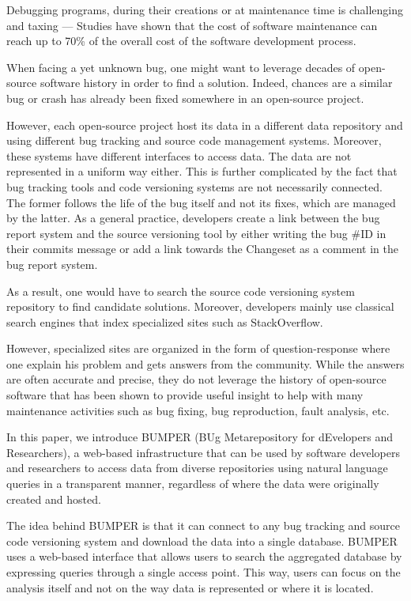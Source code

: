 \documentclass[conference]{IEEEtran}
\begin{document}
Debugging programs, during their creations or at maintenance time is challenging \cite{Pressman2005} and taxing --- Studies have shown that the cost of software maintenance can reach up to 70\% of the overall cost of the software development process.

When facing a yet unknown bug, one might want to leverage decades of open-source software history in order to find a solution. Indeed, chances are a similar bug or crash has already been fixed somewhere in an open-source project.

However, each open-source project host its data in a different data repository and using different bug tracking and source code management systems. Moreover,   these systems have different interfaces to access data.
The data are not represented in a uniform way either.
This is further complicated by the fact that bug tracking tools and code versioning systems are not necessarily connected.
The former follows the life of the bug itself and not its fixes, which are managed by the latter.
As a general practice, developers create a link between the bug report system and the source versioning tool by either writing the bug \#ID in their commits message or add a link towards the Changeset as a comment in the bug report system.

As a result, one would have to search the source code versioning system repository to find candidate solutions.
 Moreover, developers mainly use classical search engines that index specialized sites such as StackOverflow.

However, specialized sites are organized in the form of question-response where one explain his problem and gets answers from the community. While the answers are often accurate and precise, they do not leverage the history of open-source software that has been shown to provide useful insight to help with many maintenance activities such as bug fixing\cite{Saha2014}, bug reproduction\cite{Chen2013a}, fault analysis\cite{Nessa2008}, etc.

In this paper, we introduce BUMPER (BUg Metarepository for dEvelopers and Researchers), a web-based infrastructure that can be used by software developers and researchers to access data from diverse repositories using natural language queries in a transparent manner, regardless of where the data were originally created and hosted.

The idea behind BUMPER is that it can connect to any bug tracking and source code versioning system and download the data into a single database.
BUMPER uses a web-based interface that allows users to search the aggregated database by expressing queries through a single access point.
This way, users can focus on the analysis itself and not on the way data is represented or where it is located.
\end{document}
